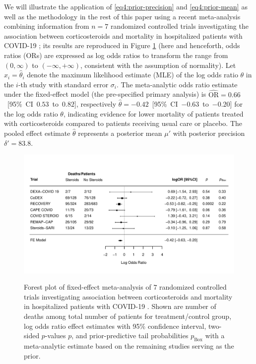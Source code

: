 We will illustrate the application of \eqref{eq4:prior-precision} and
\eqref{eq4:prior-mean} as well as the methodology in the rest of this paper
using a recent meta-analysis combining information from $n=7$ randomized
controlled trials investigating the association between corticosteroids and
mortality in hospitalized patients with COVID-19 \citep{REACT2020}; its results
are reproduced in Figure \ref{fig4:covid19-meta} (here and henceforth, odds
ratios (ORs) are expressed as log odds ratios to transform the range from
$(0, \infty)$ to $(-\infty, +\infty)$, consistent with the assumption of
normality). Let $x_i = \hat \theta_i$ denote the maximum likelihood estimate
(MLE) of the log odds ratio $\theta$ in the $i$-th study with standard error
$\sigma_i$. The meta-analytic odds ratio estimate under the fixed-effect model
(the pre-specified primary analysis) is \mbox{$\widehat{\text{OR}} = 0.66$ [95\%
  CI $0.53$ to $0.82$]}, respectively \mbox{$\hat \theta = -0.42$ [95\% CI
  $-0.63$ to $-0.20$]} for the log odds ratio $\theta$, indicating evidence for
lower mortality of patients treated with corticosteroids compared to patients
receiving usual care or placebo. The pooled effect estimate $\hat \theta$
represents a posterior mean $\mu'$ with posterior precision $\delta'=83.8$.


\begin{figure}[!htb]
\begin{knitrout}
\color{fgcolor}
{\centering \includegraphics[width=\maxwidth]{images/paper4/forest-plot-covid19-1}
}
\end{knitrout}
\caption{Forest plot of fixed-effect meta-analysis of $7$ randomized controlled
  trials investigating association between corticosteroids and mortality in
  hospitalized patients with COVID-19 \citep{REACT2020}. Shown are number of
  deaths among total number of patients for treatment/control group, log odds
  ratio effect estimates with 95\% confidence interval, two-sided $p$-values
  $p$, and prior-predictive tail probabilities $p_{\text{Box}}$ with a
  meta-analytic estimate based on the remaining studies serving as the prior.}
\label{fig4:covid19-meta}
\end{figure}



